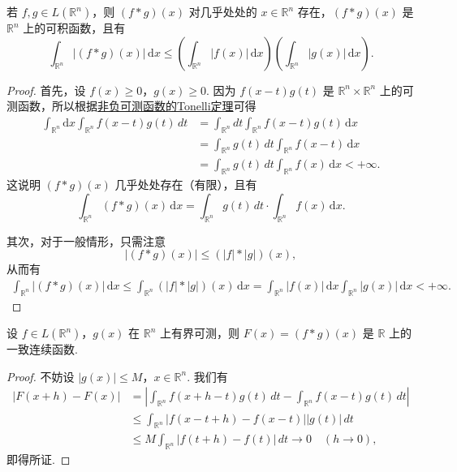 \documentclass[../../main.tex]{subfiles}
\begin{document}
\begin{theorem}
若 \( f, g \in L(\mathbb{R}^n) \)，则 \( (f * g)(x) \) 对几乎处处的 \( x \in \mathbb{R}^n \) 存在，\( (f * g)(x) \) 是 \( \mathbb{R}^n \) 上的可积函数，且有
\[
\int_{\mathbb{R}^n} |(f * g)(x)| \, \mathrm{d}x \leqslant \left( \int_{\mathbb{R}^n} |f(x)| \, \mathrm{d}x \right) \left( \int_{\mathbb{R}^n} |g(x)| \, \mathrm{d}x \right).
\]
\end{theorem}
\begin{proof}
首先，设 \( f(x) \geq 0 \)，\( g(x) \geq 0 \). 因为 \( f(x - t) g(t) \) 是 \( \mathbb{R}^n \times \mathbb{R}^n \) 上的可测函数，所以根据\hyperref[theorem:theorem:Tonelli 定理 非负可测函数的情形]{非负可测函数的Tonelli定理}可得
\begin{align*}
\int_{\mathbb{R}^n} \mathrm{d}x \int_{\mathbb{R}^n} f(x - t) g(t) \, dt &= \int_{\mathbb{R}^n} dt \int_{\mathbb{R}^n} f(x - t) g(t) \, \mathrm{d}x \\
&= \int_{\mathbb{R}^n} g(t) \, dt \int_{\mathbb{R}^n} f(x - t) \, \mathrm{d}x \\
&= \int_{\mathbb{R}^n} g(t) \, dt \int_{\mathbb{R}^n} f(x) \, \mathrm{d}x < +\infty.
\end{align*}
这说明 \( (f * g)(x) \) 几乎处处存在（有限），且有
\[
\int_{\mathbb{R}^n} (f * g)(x) \, \mathrm{d}x = \int_{\mathbb{R}^n} g(t) \, dt \cdot \int_{\mathbb{R}^n} f(x) \, \mathrm{d}x.
\]

其次，对于一般情形，只需注意
\[
|(f * g)(x)| \leq (|f| * |g|)(x),
\]
从而有
\begin{align*}
\int_{\mathbb{R}^n} |(f * g)(x)| \, \mathrm{d}x \leq \int_{\mathbb{R}^n} (|f| * |g|)(x) \, \mathrm{d}x = \int_{\mathbb{R}^n} |f(x)| \, \mathrm{d}x \int_{\mathbb{R}^n} |g(x)| \, \mathrm{d}x < +\infty.
\end{align*}
\end{proof}

\begin{proposition}[卷积是连续函数]\label{proposition:卷积是连续函数}
设 \( f \in L(\mathbb{R}^n) \)，\( g(x) \) 在 \( \mathbb{R}^n \) 上有界可测，则 \( F(x) = (f * g)(x) \) 是 \( \mathbb{R} \) 上的一致连续函数.
\end{proposition}
\begin{proof}
不妨设 \( |g(x)| \leq M \)，\( x \in \mathbb{R}^n \). 我们有
\begin{align*}
|F(x + h) - F(x)| &= \left| \int_{\mathbb{R}^n} f(x + h - t) g(t) \, dt - \int_{\mathbb{R}^n} f(x - t) g(t) \, dt \right| \\
&\leq \int_{\mathbb{R}^n} |f(x - t + h) - f(x - t)| |g(t)| \, dt \\
&\leq M \int_{\mathbb{R}^n} |f(t + h) - f(t)| \, dt \to 0 \quad (h \to 0),
\end{align*}
即得所证.
\end{proof}
\end{document}
